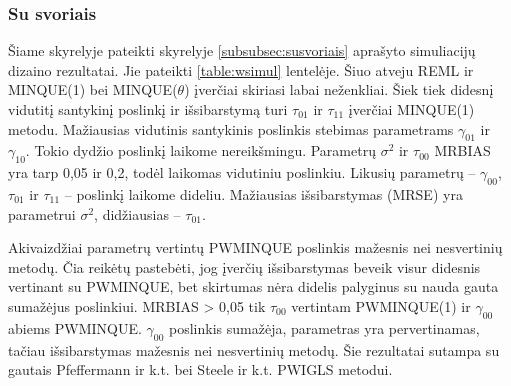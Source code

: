 \documentclass[12pt,a4paper]{article}
\begin{document}
\subsubsection{Su svoriais}
\indent Šiame skyrelyje pateikti skyrelyje \ref{subsubsec:susvoriais} aprašyto simuliacijų dizaino rezultatai. Jie pateikti \ref{table:wsimul} lentelėje. Šiuo atveju REML ir MINQUE(1) bei MINQUE($\theta$) įverčiai skiriasi labai neženkliai. Šiek tiek didesnį vidutitį santykinį poslinkį ir išsibarstymą turi $\tau_{01}$ ir $\tau_{11}$ įverčiai MINQUE(1) metodu. Mažiausias vidutinis santykinis poslinkis stebimas parametrams $\gamma_{01}$ ir $\gamma_{10}$. Tokio dydžio poslinkį laikome nereikšmingu. Parametrų $\sigma^2$ ir $\tau_{00}$ MRBIAS yra tarp 0,05 ir 0,2, todėl laikomas vidutiniu poslinkiu. Likusių parametrų -- $\gamma_{00}$, $\tau_{01}$ ir $\tau_{11}$ -- poslinkį laikome dideliu. Mažiausias išsibarstymas (MRSE) yra parametrui $\sigma^2$, didžiausias -- $\tau_{01}$. 

\indent Akivaizdžiai parametrų vertintų PWMINQUE poslinkis mažesnis nei nesvertinių metodų. Čia reikėtų pastebėti, jog įverčių išsibarstymas beveik visur didesnis vertinant su PWMINQUE, bet skirtumas nėra didelis palyginus su nauda gauta sumažėjus poslinkiui.    MRBIAS > 0,05 tik $\tau_{00}$ vertintam PWMINQUE(1) ir $\gamma_{00}$ abiems PWMINQUE. $\gamma_{00}$ poslinkis sumažėja, parametras yra pervertinamas, tačiau išsibarstymas mažesnis nei nesvertinių metodų. Šie rezultatai sutampa su gautais  Pfeffermann ir k.t.\cite{pfeff} bei Steele ir k.t.\cite{mlwin} PWIGLS metodui.
\end{document}
